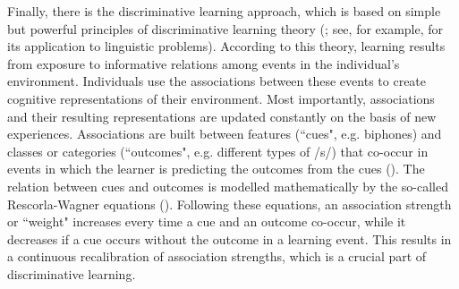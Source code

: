 Finally, there is the discriminative learning approach, which is based on simple but powerful principles of discriminative learning theory (\cite{Rescorla1988, Ramscar2007, Ramscar2010}; see, for example, \cite{Baayen2011, Baayen2019} for its application to linguistic problems). According to this theory, learning results from exposure to informative relations among events in the individual’s environment. Individuals use the associations between these events to create cognitive representations of their environment. Most importantly, associations and their resulting representations are updated constantly on the basis of new experiences. Associations are built between features (``cues", e.g. biphones) and classes or categories (``outcomes", e.g. different types of /s/) that co-occur in events in which the learner is predicting the outcomes from the cues (\cite{Tomaschek2019}). The relation between cues and outcomes is modelled mathematically by the so-called Rescorla-Wagner equations (\cite{Rescorla1972, Wagner1972, Rescorla1988}). Following these equations, an association strength or ``weight" increases every time a cue and an outcome co-occur, while it decreases if a cue occurs without the outcome in a learning event. This results in a continuous recalibration of association strengths, which is a crucial part of discriminative learning. 

